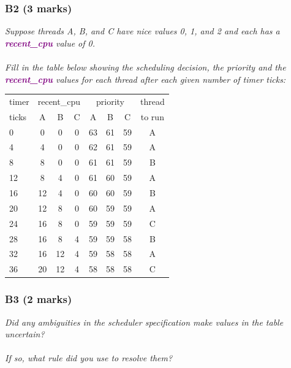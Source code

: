 \documentclass{report}
\newcommand{\question}[1]{\textit{#1} \\ }
\newcommand{\var}[1]{\textcolor{purple}{\textbf{#1}}}
\begin{document}
            \subsubsection*{B2  (3 marks)}
                \question{Suppose threads A, B, and C have nice values 0, 1, and 2 and each has a \var{recent\_cpu} value of 0. 
                \\
                \\Fill in the table below showing the scheduling decision, the priority and the \var{recent\_cpu} values for each thread after each given number of timer ticks:}
            \begin{center}
                \begin{tabular}{l c c c c c c c}
                    timer & \multicolumn{3}{c}{recent\_cpu} & \multicolumn{3}{c}{priority} & thread \\
                    ticks & A & B & C & A & B & C & to run  \\
                    0 & 0 & 0 & 0 & 63 & 61 & 59 & A \\
                    4 & 4 & 0 & 0 & 62 & 61 & 59 & A \\
                    8 & 8 & 0 & 0 & 61 & 61 & 59 & B \\
                    12 & 8 & 4 & 0 & 61 & 60 & 59 & A \\
                    16 & 12 & 4 & 0 & 60 & 60 & 59 & B \\
                    20 & 12 & 8 & 0 & 60 & 59 & 59 & A \\
                    24 & 16 & 8 & 0 & 59 & 59 & 59 & C \\
                    28 & 16 & 8 & 4 & 59 & 59 & 58 & B \\
                    32 & 16 & 12 & 4 & 59 & 58 & 58 & A \\
                    36 & 20 & 12 & 4 & 58 & 58 & 58 & C \\
                \end{tabular}
            \end{center}

            \subsubsection*{B3  (2 marks) }
                \question{Did any ambiguities in the scheduler specification make values in the table uncertain? 
                \\
                \\ If so, what rule did you use to resolve them?}
\end{document}
